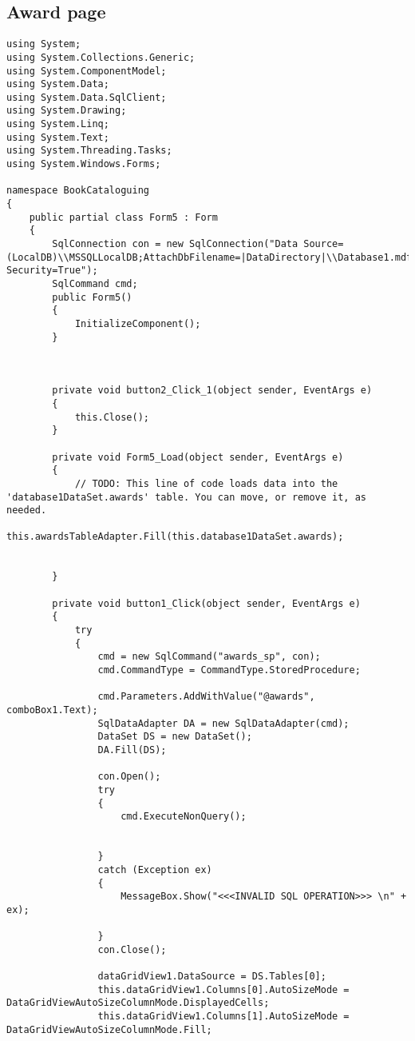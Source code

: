 \subsection{Award page}
\begin{lstlisting}
using System;
using System.Collections.Generic;
using System.ComponentModel;
using System.Data;
using System.Data.SqlClient;
using System.Drawing;
using System.Linq;
using System.Text;
using System.Threading.Tasks;
using System.Windows.Forms;

namespace BookCataloguing
{
    public partial class Form5 : Form
    {
        SqlConnection con = new SqlConnection("Data Source=(LocalDB)\\MSSQLLocalDB;AttachDbFilename=|DataDirectory|\\Database1.mdf;Integrated Security=True");
        SqlCommand cmd;
        public Form5()
        {
            InitializeComponent();
        }

        

        private void button2_Click_1(object sender, EventArgs e)
        {
            this.Close();
        }

        private void Form5_Load(object sender, EventArgs e)
        {
            // TODO: This line of code loads data into the 'database1DataSet.awards' table. You can move, or remove it, as needed.
            this.awardsTableAdapter.Fill(this.database1DataSet.awards);
            

        }

        private void button1_Click(object sender, EventArgs e)
        {
            try
            {
                cmd = new SqlCommand("awards_sp", con);
                cmd.CommandType = CommandType.StoredProcedure;

                cmd.Parameters.AddWithValue("@awards", comboBox1.Text);
                SqlDataAdapter DA = new SqlDataAdapter(cmd);
                DataSet DS = new DataSet();
                DA.Fill(DS);

                con.Open();
                try
                {
                    cmd.ExecuteNonQuery();


                }
                catch (Exception ex)
                {
                    MessageBox.Show("<<<INVALID SQL OPERATION>>> \n" + ex);

                }
                con.Close();

                dataGridView1.DataSource = DS.Tables[0];
                this.dataGridView1.Columns[0].AutoSizeMode = DataGridViewAutoSizeColumnMode.DisplayedCells;
                this.dataGridView1.Columns[1].AutoSizeMode = DataGridViewAutoSizeColumnMode.Fill;
                





\end{lstlisting}
